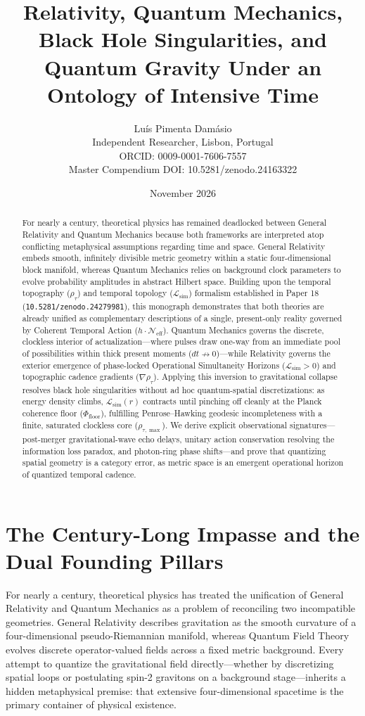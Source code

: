 \documentclass[11pt,a4paper]{article}
\title{\textbf{Relativity, Quantum Mechanics, Black Hole Singularities, and Quantum Gravity Under an Ontology of Intensive Time}}
\author{Lu\'is Pimenta Dam\'asio \\ \small Independent Researcher, Lisbon, Portugal \\ \small ORCID: 0009-0001-7606-7557 \\ \small Master Compendium DOI: 10.5281/zenodo.24163322}
\date{November 2026}
\begin{document}
\maketitle

\begin{abstract}
For nearly a century, theoretical physics has remained deadlocked between General Relativity and Quantum Mechanics because both frameworks are interpreted atop conflicting metaphysical assumptions regarding time and space. General Relativity embeds smooth, infinitely divisible metric geometry within a static four-dimensional block manifold, whereas Quantum Mechanics relies on background clock parameters to evolve probability amplitudes in abstract Hilbert space. Building upon the temporal topography ($\rho_\tau$) and temporal topology ($\mathcal{L}_{\mathrm{sim}}$) formalism established in Paper 18 (\texttt{10.5281/zenodo.24279981}), this monograph demonstrates that both theories are already unified as complementary descriptions of a single, present-only reality governed by Coherent Temporal Action ($h \cdot \mathcal{N}_{\mathrm{eff}}$). Quantum Mechanics governs the discrete, clockless interior of actualization---where pulses draw one-way from an immediate pool of possibilities within thick present moments ($dt \not\to 0$)---while Relativity governs the exterior emergence of phase-locked Operational Simultaneity Horizons ($\mathcal{L}_{\mathrm{sim}} > 0$) and topographic cadence gradients ($\nabla \rho_\tau$). Applying this inversion to gravitational collapse resolves black hole singularities without ad hoc quantum-spatial discretizations: as energy density climbs, $\mathcal{L}_{\mathrm{sim}}(r)$ contracts until pinching off cleanly at the Planck coherence floor ($\Phi_{\mathrm{floor}}$), fulfilling Penrose--Hawking geodesic incompleteness with a finite, saturated clockless core ($\rho_{\tau,\max}$). We derive explicit observational signatures---post-merger gravitational-wave echo delays, unitary action conservation resolving the information loss paradox, and photon-ring phase shifts---and prove that quantizing spatial geometry is a category error, as metric space is an emergent operational horizon of quantized temporal cadence.
\end{abstract}

\section{The Century-Long Impasse and the Dual Founding Pillars}

For nearly a century, theoretical physics has treated the unification of General Relativity and Quantum Mechanics as a problem of reconciling two incompatible geometries. General Relativity describes gravitation as the smooth curvature of a four-dimensional pseudo-Riemannian manifold, whereas Quantum Field Theory evolves discrete operator-valued fields across a fixed metric background. Every attempt to quantize the gravitational field directly---whether by discretizing spatial loops or postulating spin-2 gravitons on a background stage---inherits a hidden metaphysical premise: that extensive four-dimensional spacetime is the primary container of physical existence.
\end{document}
